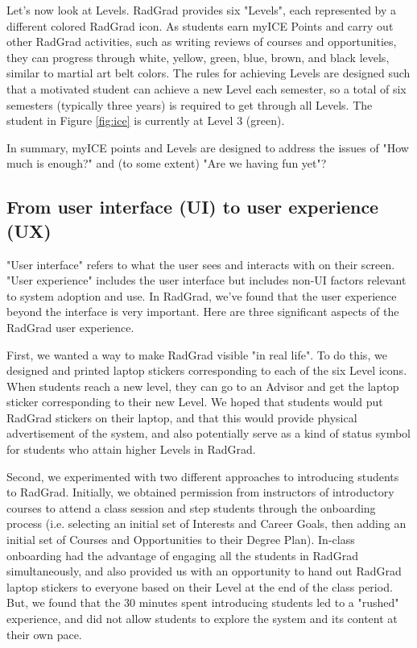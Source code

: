 \documentclass[acmsmall,nonacm]{acmart}
\begin{document}
Let's now look at Levels.  RadGrad provides six "Levels", each represented by a different colored RadGrad icon. As students earn myICE Points and carry out other RadGrad activities, such as writing reviews of courses and opportunities, they can progress through white, yellow, green, blue, brown, and black levels, similar to martial art belt colors. The rules for achieving Levels are designed such that a motivated student can achieve a new Level each semester, so a total of six semesters (typically three years) is required to get through all Levels.  The student in Figure \ref{fig:ice} is currently at Level 3 (green).

In summary, myICE points and Levels are designed to address the issues of "How much is enough?" and (to some extent) "Are we having fun yet"?

\subsection{From user interface (UI) to user experience (UX)}

"User interface" refers to what the user sees and interacts with on their screen. "User experience" includes the user interface but includes non-UI factors relevant to system adoption and use.  In RadGrad, we've found that the user experience beyond the interface is very important. Here are three significant aspects of the RadGrad user experience.

First, we wanted a way to make RadGrad visible "in real life".  To do this, we designed and printed laptop stickers corresponding to each of the six Level icons. When students reach a new level, they can go to an Advisor and get the laptop sticker corresponding to their new Level. We hoped that students would put RadGrad stickers on their laptop, and that this would provide physical advertisement of the system, and also potentially serve as a kind of status symbol for students who attain higher Levels in RadGrad.

Second, we experimented with two different approaches to introducing students to RadGrad. Initially, we obtained permission from instructors of introductory courses to attend a class session and step students through the onboarding process (i.e. selecting an initial set of Interests and Career Goals, then adding an initial set of Courses and Opportunities to their Degree Plan).  In-class onboarding had the advantage of engaging all the students in RadGrad simultaneously, and also provided us with an opportunity to hand out RadGrad laptop stickers to everyone based on their Level at the end of the class period.  But, we found that the 30 minutes spent introducing students led to a "rushed" experience, and did not allow students to explore the system and its content at their own pace.
\end{document}
